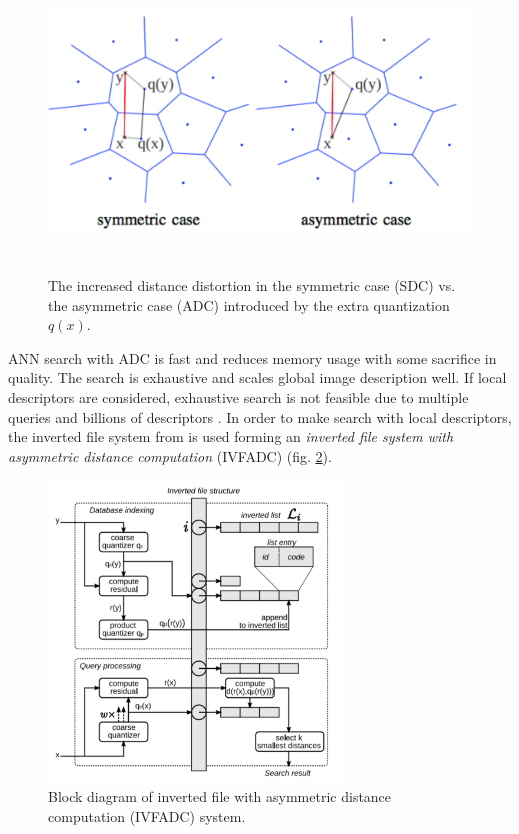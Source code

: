 \documentclass[english,12pt,a4paper,pdftex,elec,utf8]{aaltothesis}
\begin{document}
\begin{figure}[htb]
\begin{center}
\includegraphics[height=8cm]{figures/sdcadc}
\end{center}
\caption{The increased distance distortion in the symmetric case (SDC) vs. the asymmetric case (ADC) introduced by the extra quantization $q(x)$. \cite{Jegou2008}}
\label{nosdc}
\end{figure}

ANN search with ADC is fast and reduces memory usage with some sacrifice in quality. The search is exhaustive and scales global image description well. If local descriptors are considered, exhaustive search is not feasible due to multiple queries and billions of descriptors \cite{Jegou2008}. In order to make search with local descriptors, the inverted file system from \cite{Sivic2003} is used forming an \emph{inverted file system with asymmetric distance computation} (IVFADC) (fig. \ref{ivfadcfig}).

\begin{figure}[htb]
\begin{center}
\includegraphics[height=8cm]{figures/ivfadc}
\end{center}
\caption{Block diagram of inverted file with asymmetric distance computation (IVFADC) system. \cite{Jegou2008}}
\label{ivfadcfig}
\end{figure}
\end{document}
